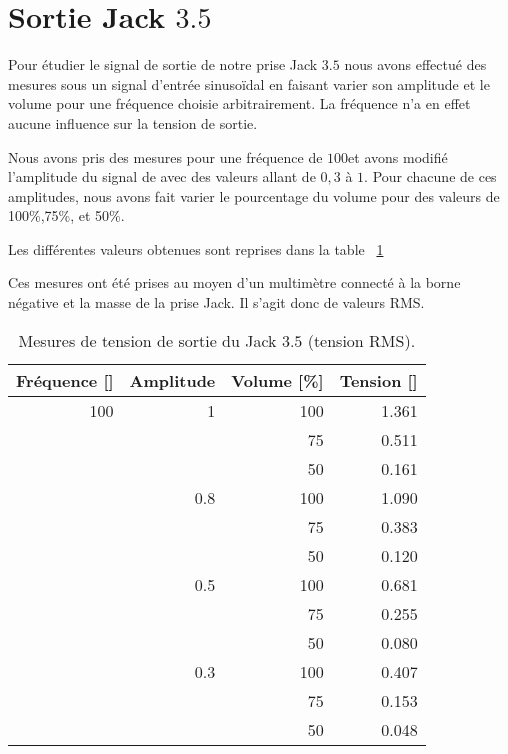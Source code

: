 \section{Sortie Jack $3.5$\milli \meter}

Pour étudier le signal de sortie de notre prise Jack $3.5$ \milli \meter nous avons effectué des mesures sous un signal d'entrée sinusoïdal en faisant varier
son amplitude et le volume pour une fréquence choisie arbitrairement. La fréquence n'a en effet aucune influence sur la tension de sortie. 

Nous avons pris des mesures pour une fréquence de $100$\hertz et avons modifié l'amplitude du signal de avec des valeurs allant de $0,3$ à $1$. Pour chacune de ces amplitudes, nous avons fait varier le pourcentage du volume pour des valeurs de 100\%,75\%, et 50\%.

Les différentes valeurs obtenues sont reprises dans la table ~\ref{tab : Sortie Jack} 

Ces mesures ont été prises au moyen d'un multimètre connecté à la borne négative et la masse de la prise Jack. Il s'agit donc de valeurs RMS.




\begin{table}
\begin {center}
\begin{tabular}{|r|r|r|r|}
\hline

	Fréquence [\hertz] & Amplitude & Volume [\%] & Tension [\volt] \\
\hline
		100 & 1 & 100 & 1.361 \\
	 	& & 75 & 0.511 \\
	 	& & 50 & 0.161 \\
	 \cline{2-4}
		 & 0.8 & 100 & 1.090 \\
		 \cline{3-5}
		 & & 75 & 0.383 \\
		  \cline{3-5}
		 & & 50 & 0.120 \\
	 \cline{2-4}
	 	& 0.5 & 100 & 0.681\\
		 \cline{3-5}
	 	& & 75 & 0.255 \\
		 \cline{3-5}
	 	& & 50 & 0.080 \\
	 \cline{2-4}
	 	& 0.3 & 100 & 0.407 \\
		 \cline{3-5}
	 	& & 75 & 0.153 \\
		 \cline{3-5}
	 	& & 50 & 0.048 \\
\hline
\end{tabular}
\caption{Mesures de tension de sortie du Jack $3.5$ \milli \meter (tension RMS).}
\label{tab : Sortie Jack}
\end{center}
\end{table}
